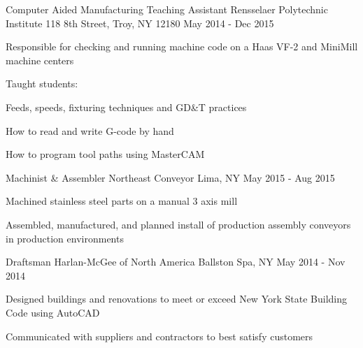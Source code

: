 \begin{cventries}
  \cventry
    {Computer Aided Manufacturing Teaching Assistant} %
    {Rensselaer Polytechnic Institute} %
    {118 8th Street, Troy, NY 12180} %
    {May 2014 - Dec 2015} %
    {
      \begin{cvitems} %
        \item {Responsible for checking and running machine code on a Haas VF-2 and MiniMill machine centers}
        \item {Taught students:\newline}
        \begin{cvsubitems}
        \vspace{0.4cm}
            \item {Feeds, speeds, fixturing techniques and GD\&T practices}
            \item {How to read and write G-code by hand}
            \item {How to program tool paths using MasterCAM}
        \vspace{0.4cm}
        \end{cvsubitems}
      \end{cvitems}
    }
    
  \cventry
    {Machinist \& Assembler} %
    {Northeast Conveyor} %
    {Lima, NY} %
    {May 2015 - Aug 2015} %
    {
      \begin{cvitems} %
        \item {Machined stainless steel parts on a manual 3 axis mill}
        \item {Assembled, manufactured, and planned install of production assembly conveyors in production environments}
      \end{cvitems}
    }

  \cventry
    {Draftsman} %
    {Harlan-McGee of North America} %
    {Ballston Spa, NY} %
    {May 2014 - Nov 2014} %
    {
      \begin{cvitems} %
        \item {Designed buildings and renovations to meet or exceed New York State Building Code using AutoCAD}
        \item {Communicated with suppliers and contractors to best satisfy customers}
      \end{cvitems}
    }


\end{cventries}
